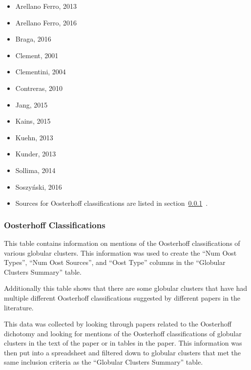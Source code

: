 \documentclass[]{article}
\begin{document}
\begin{itemize}
	\item Arellano Ferro, 2013 \cite{arellano_ferro_2013}
	\item Arellano Ferro, 2016 \cite{arellano_ferro_2016_b}
	\item Braga, 2016 \cite{braga_2016}
	\item Clement, 2001 \cite{clement_2001_a}
	\item Clementini, 2004 \cite{clementini_2004}
	\item Contreras, 2010 \cite{contreras_2010}
	\item Jang, 2015 \cite{jang_2015}
	\item Kains, 2015 \cite{kains_2015}
	\item Kuehn, 2013 \cite{kuehn_2013}
	\item Kunder, 2013 \cite{kunder_2013_d}
	\item Sollima, 2014 \cite{sollima_2014}
	\item Soszyński, 2016 \cite{soszynski_2016}
	\item Sources for Oosterhoff classifications are listed in section~\ref{sec:app_oosterhoff_classifications}~.
\end{itemize}

\newpage

\subsubsection{Oosterhoff Classifications}
\label{sec:app_oosterhoff_classifications}

This table contains information on mentions of the Oosterhoff classifications of various globular clusters. This information was used to create the ``Num Oost Types'', ``Num Oost Sources'', and ``Oost Type'' columns in the ``Globular Clusters Summary'' table.

\vspace{12pt}

Additionally this table shows that there are some globular clusters that have had multiple different Oosterhoff classifications suggested by different papers in the literature.

\vspace{12pt}

This data was collected by looking through papers related to the Oosterhoff dichotomy and looking for mentions of the Oosterhoff classifications of globular clusters in the text of the paper or in tables in the paper. This information was then put into a spreadsheet and filtered down to globular clusters that met the same inclusion criteria as the ``Globular Clusters Summary'' table.
\end{document}

